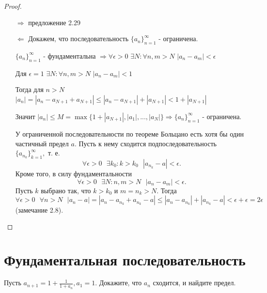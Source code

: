	\begin{proof}
		\begin{itemize}
			\item[$\Rightarrow$] предложение 2.29
		    \item[$\Leftarrow$] Докажем, что последовательность $\{a_n\}^{\infty}_{n = 1}$ - ограничена.
		    
		    $\{a_n\}^{\infty}_{n = 1}$ - фундаментальна $\Rightarrow \forall \epsilon > 0$ $\exists N: \forall n, m > N$ $|a_n - a_m| < \epsilon$
		    
		    Для $\epsilon = 1$ $\exists N: \forall n, m > N$ $|a_n - a_m| < 1$
		    
		    Тогда для $n > N$ $|a_n| = |a_n - a_{N + 1} + a_{N + 1}| \leqslant |a_n - a_{N + 1}| + |a_{N + 1}| < 1 + |a_{N + 1}|$
		    
		    Значит $|a_n| \leqslant M = \max\{1 + |a_{N + 1}|, |a_1|, ..., |a_N|\} \Rightarrow \{a_n\}^{\infty}_{n = 1}$ - ограничена.
		    
		    У ограниченной последовательности по теореме Больцано есть хотя бы один частичный предел $a$. Пусть к нему сходится подпоследовательность $\{a_{n_k}\}^{\infty}_{k = 1},$ т. е.
		    \[ \forall \epsilon > 0 \text{ } \exists k_0: k > k_0 \text{ } |a_{n_k} - a| < \epsilon. \]
		    Кроме того, в силу фундаментальности
		    \[ \forall \epsilon > 0 \text{ } \exists N: n, m > N \text{ } |a_n - a_m| < \epsilon. \]
		    Пусть $k$ выбрано так, что $k > k_0$ и $m = n_k > N.$ Тогда 
		    \[ \forall \epsilon > 0 \text{ } \forall n > N \text{ } |a_n - a| = |a_n - a_{n_k} + a_{n_k} - a| \leqslant |a_n - a_{n_k}| + |a_{n_k} - a| < \epsilon + \epsilon = 2\epsilon \]
		    (замечание 2.8).
		\end{itemize}
	\end{proof}
	
	\section{Фундаментальная последовательность}
	
	\begin{example}
		Пусть $a_{n + 1} = 1 + \frac{1}{1 + a_n}, a_1 = 1$. Докажите, что $a_n$ сходится, и найдите предел.
	\end{example}
	
